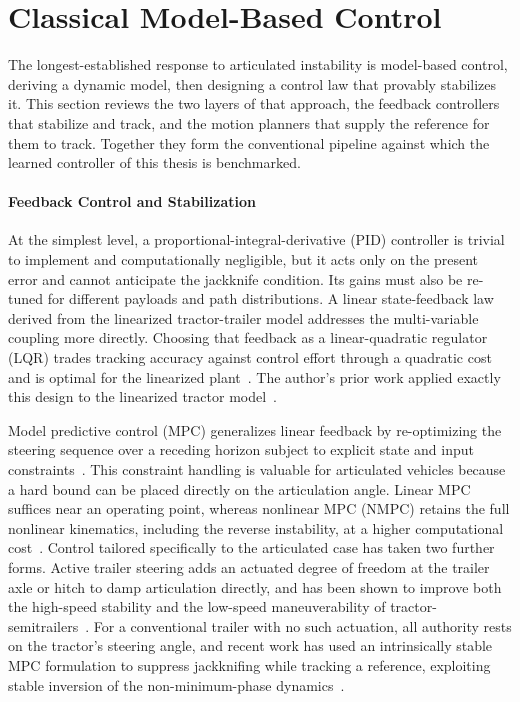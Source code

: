 \section{Classical Model-Based Control}

The longest-established response to articulated instability is model-based control, deriving a dynamic model, then designing a control law that provably stabilizes it. This section reviews the two layers of that approach, the feedback controllers that stabilize and track, and the motion planners that supply the reference for them to track. Together they form the conventional pipeline against which the learned controller of this thesis is benchmarked.

\paragraph{Feedback Control and Stabilization}
At the simplest level, a proportional-integral-derivative (PID) controller is trivial to implement and computationally negligible, but it acts only on the present error and cannot anticipate the jackknife condition. Its gains must also be re-tuned for different payloads and path distributions. A linear state-feedback law derived from the linearized tractor-trailer model addresses the multi-variable coupling more directly. Choosing that feedback as a linear-quadratic regulator (LQR) trades tracking accuracy against control effort through a quadratic cost and is optimal for the linearized plant~\cite{anderson1990optimal}. The author's prior work applied exactly this design to the linearized tractor model~\cite{schnapp2024ece682}.

Model predictive control (MPC) generalizes linear feedback by re-optimizing the steering sequence over a receding horizon subject to explicit state and input constraints~\cite{rawlings2017mpc}. This constraint handling is valuable for articulated vehicles because a hard bound can be placed directly on the articulation angle. Linear MPC suffices near an operating point, whereas nonlinear MPC (NMPC) retains the full nonlinear kinematics, including the reverse instability, at a higher computational cost~\cite{mayne2000constrained}. Control tailored specifically to the articulated case has taken two further forms. Active trailer steering adds an actuated degree of freedom at the trailer axle or hitch to damp articulation directly, and has been shown to improve both the high-speed stability and the low-speed maneuverability of tractor-semitrailers~\cite{odhams2011active, jujnovich2013path}. For a conventional trailer with no such actuation, all authority rests on the tractor's steering angle, and recent work has used an intrinsically stable MPC formulation to suppress jackknifing while tracking a reference, exploiting stable inversion of the non-minimum-phase dynamics~\cite{beglini2020antijackknife}.

